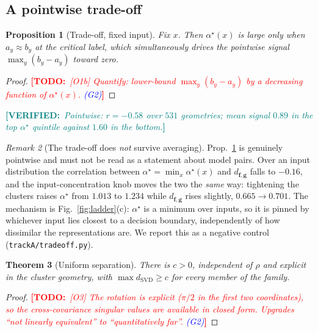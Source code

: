 \documentclass[10pt,letterpaper,twocolumn]{article}
\newcommand{\TODO}[1]{\textcolor{red}{\small\textbf{[TODO:}~\textit{#1}\textbf{]}}}
\newcommand{\GATE}[1]{\textcolor{blue}{\textsf{\scriptsize (#1)}}}
\newcommand{\DONE}[1]{\textcolor{teal}{\small\textbf{[VERIFIED:}~\textit{#1}\textbf{]}}}
\newcommand{\bff}{\mathbf{f}}
\newcommand{\bfg}{\mathbf{g}}
\newcommand{\dSVD}{d_{\mathrm{SVD}}}
\newcommand{\dfg}{d_{\bff,\bfg}}
\theoremstyle{plain}
\newtheorem{theorem}{Theorem}
\newtheorem{proposition}[theorem]{Proposition}
\theoremstyle{definition}
\theoremstyle{remark}
\newtheorem{remark}[theorem]{Remark}
\begin{document}
\subsection{A pointwise trade-off}

\begin{proposition}[Trade-off, fixed input]
\label{prop:tradeoff}
Fix $x$. Then $\alpha^{\star}(x)$ is large only when $a_{y}\approx b_{y}$ at the
critical label, which simultaneously drives the pointwise signal
$\max_{y}(b_{y}-a_{y})$ toward zero.
\end{proposition}

\begin{proof}
\TODO{[O1b] Quantify: lower-bound $\max_{y}(b_{y}-a_{y})$ by a decreasing
function of $\alpha^{\star}(x)$. \GATE{G2}}
\end{proof}

\DONE{Pointwise: $r=-0.58$ over $531$ geometries; mean signal $0.89$ in the top
$\alpha^{\star}$ quintile against $1.60$ in the bottom.}

\begin{remark}[The trade-off does \emph{not} survive averaging]
\label{rem:noavg}
Prop.~\ref{prop:tradeoff} is genuinely pointwise and must not be read as a
statement about model pairs. Over an input distribution the correlation between
$\alpha^{\star}=\min_{x}\alpha^{\star}(x)$ and $\dfg$ falls to $-0.16$, and the
input-concentration knob moves the two the \emph{same} way: tightening the
clusters raises $\alpha^{\star}$ from $1.013$ to $1.234$ while $\dfg$ rises
slightly, $0.665\to0.701$. The mechanism is Fig.~\ref{fig:ladder}(c):
$\alpha^{\star}$ is a minimum over inputs, so it is pinned by whichever input
lies closest to a decision boundary, independently of how dissimilar the
representations are. We report this as a negative control
(\texttt{trackA/tradeoff.py}).
\end{remark}

\begin{theorem}[Uniform separation]
\label{thm:lower}
There is $c>0$, independent of $\rho$ and explicit in the cluster geometry, with
$\max\dSVD\ge c$ for every member of the family.
\end{theorem}
\begin{proof}
\TODO{[O3] The rotation is explicit ($\pi/2$ in the first two coordinates), so
the cross-covariance singular values are available in closed form. Upgrades
``not linearly equivalent'' to ``quantitatively far''. \GATE{G2}}
\end{proof}
\end{document}
